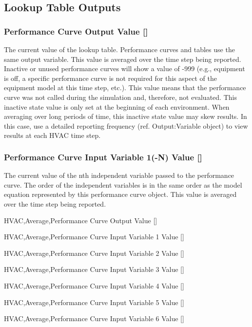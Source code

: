 \subsection{Lookup Table Outputs}\label{lookup-table-outputs}

\subsubsection{Performance Curve Output Value {[]}}\label{performance-curve-output-value-2}

The current value of the lookup table. Performance curves and tables use the same output variable. This value is averaged over the time step being reported. Inactive or unused performance curves will show a value of -999 (e.g., equipment is off, a specific performance curve is not required for this aspect of the equipment model at this time step, etc.). This value means that the performance curve was not called during the simulation and, therefore, not evaluated. This inactive state value is only set at the beginning of each environment. When averaging over long periods of time, this inactive state value may skew results. In this case, use a detailed reporting frequency (ref. Output:Variable object) to view results at each HVAC time step.

\subsubsection{Performance Curve Input Variable 1(-N) Value {[]}}\label{performance-curve-input-variable-1-n-value-000}

The current value of the nth independent variable passed to the performance curve. The order of the independent variables is in the same order as the model equation represented by this performance curve object. This value is averaged over the time step being reported.

HVAC,Average,Performance Curve Output Value {[]}

HVAC,Average,Performance Curve Input Variable 1 Value {[]}

HVAC,Average,Performance Curve Input Variable 2 Value {[]}

HVAC,Average,Performance Curve Input Variable 3 Value {[]}

HVAC,Average,Performance Curve Input Variable 4 Value {[]}

HVAC,Average,Performance Curve Input Variable 5 Value {[]}

HVAC,Average,Performance Curve Input Variable 6 Value {[]}

